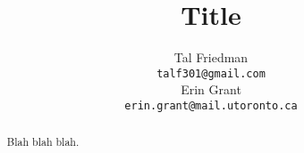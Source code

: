 \documentclass{article} %
\title{Title}
\author{
Tal Friedman \\
\texttt{talf301@gmail.com} \\
\And
Erin Grant \\
\texttt{erin.grant@mail.utoronto.ca}
}
\begin{document}

\maketitle


\begin{abstract}

    Blah blah blah.

\end{abstract}












\newpage

\newpage


\newpage


\end{document}
